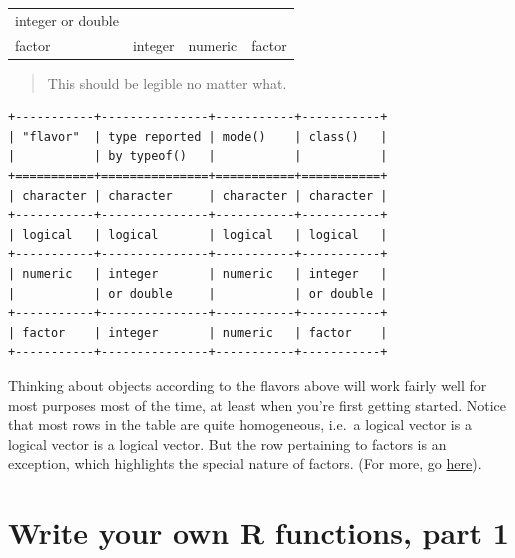 \documentclass[
]{book}
\begin{document}
\begin{longtable}[]{@{}llll@{}}
\begin{minipage}[t]{0.15\columnwidth}
integer
or double\strut
\end{minipage}\tabularnewline
\begin{minipage}[t]{0.15\columnwidth}\raggedright
factor\strut
\end{minipage} & \begin{minipage}[t]{0.20\columnwidth}\raggedright
integer\strut
\end{minipage} & \begin{minipage}[t]{0.15\columnwidth}\raggedright
numeric\strut
\end{minipage} & \begin{minipage}[t]{0.15\columnwidth}\raggedright
factor\strut
\end{minipage}\tabularnewline
\bottomrule
\end{longtable}

\begin{quote}
This should be legible no matter what.
\end{quote}

\begin{verbatim}
+-----------+---------------+-----------+-----------+
| "flavor"  | type reported | mode()    | class()   |
|           | by typeof()   |           |           |
+===========+===============+===========+===========+
| character | character     | character | character |
+-----------+---------------+-----------+-----------+
| logical   | logical       | logical   | logical   |
+-----------+---------------+-----------+-----------+
| numeric   | integer       | numeric   | integer   |
|           | or double     |           | or double |
+-----------+---------------+-----------+-----------+
| factor    | integer       | numeric   | factor    |
+-----------+---------------+-----------+-----------+
\end{verbatim}

Thinking about objects according to the flavors above will work fairly well for most purposes most of the time, at least when you're first getting started. Notice that most rows in the table are quite homogeneous, i.e.~a logical vector is a logical vector is a logical vector. But the row pertaining to factors is an exception, which highlights the special nature of factors. (For more, go \protect\hyperlink{factors-boss}{here}).

\hypertarget{functions-part1}{%
\chapter{Write your own R functions, part 1}\label{functions-part1}}
\end{document}
